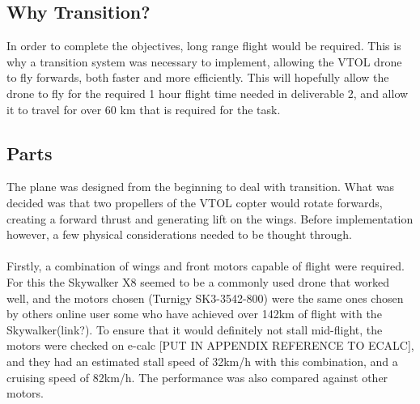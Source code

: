 
\subsection{Why Transition?}
In order to complete the objectives, long range flight would be required. This is why a transition system was necessary to implement, allowing the VTOL drone to fly forwards, both faster and more efficiently. This will hopefully allow the drone to fly for the required 1 hour flight time needed in deliverable 2, and allow it to travel for over 60 km that is required for the task. 

\subsection{Parts}
The plane was designed from the beginning to deal with transition. What was decided was that two propellers of the VTOL copter would rotate forwards, creating a forward thrust and generating lift on the wings.  Before implementation however, a few physical considerations needed to be thought through.
\\\\
Firstly, a combination of wings and front motors capable of flight were required.  For this the Skywalker X8 seemed to be a commonly used drone that worked well, and the motors chosen (Turnigy SK3-3542-800) were the same ones chosen by others online user some who have achieved over 142km of flight with the Skywalker(link?). To ensure that it would definitely not stall mid-flight, the motors were checked on e-calc \color{red}[PUT IN APPENDIX REFERENCE TO ECALC]\color{black}, and they had an estimated stall speed of 32km/h with this combination, and a cruising speed of 82km/h.  The performance was also compared against other motors. 

